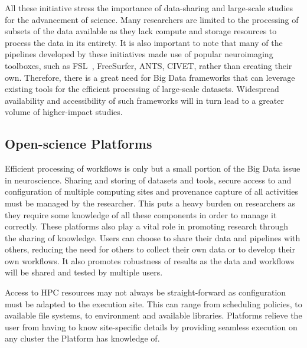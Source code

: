             All these initiative stress the importance of data-sharing and
            large-scale studies for the advancement of science. Many researchers
            are limited to the processing of subsets of the data available as 
            they lack compute and storage resources to process the data in its
            entirety. It is also important to note that many of the pipelines 
            developed by these initiatives made use of popular neuroimaging 
            toolboxes, such as FSL~\cite{SMITH2004S208}, FreeSurfer, ANTS, 
            CIVET, rather than
            creating their own. Therefore, there is a great need for Big Data
            frameworks that can leverage existing tools for the efficient 
            processing of large-scale datasets. Widespread availability and 
            accessibility of such frameworks will in turn lead to a greater
            volume of higher-impact studies.


        \subsection{Open-science Platforms}\label{platforms}
            Efficient processing of workflows is only but a small portion of 
            the Big Data issue in neuroscience. %
            Sharing and storing of datasets
            and tools, secure access to and configuration of multiple computing 
            sites and provenance capture of all activities must be managed by 
            the researcher. This puts a heavy burden on researchers as they 
            require some knowledge of all these components in order to manage it
            correctly. These platforms also play a vital role in promoting 
            research through the sharing of knowledge. Users can choose to share
            their data and pipelines with others, reducing the need for others 
            to collect their own data or to develop their own workflows. It 
            also promotes robustness of results as the data and workflows will 
            be shared and tested by multiple users.

            Access to HPC resources may not always be straight-forward as 
            configuration must be adapted to the execution site. This can 
            range from scheduling policies, to available file systems, to 
            environment and available libraries. Platforms relieve the user
            from having to know site-specific details by providing seamless
            execution on any cluster the Platform has knowledge of.

